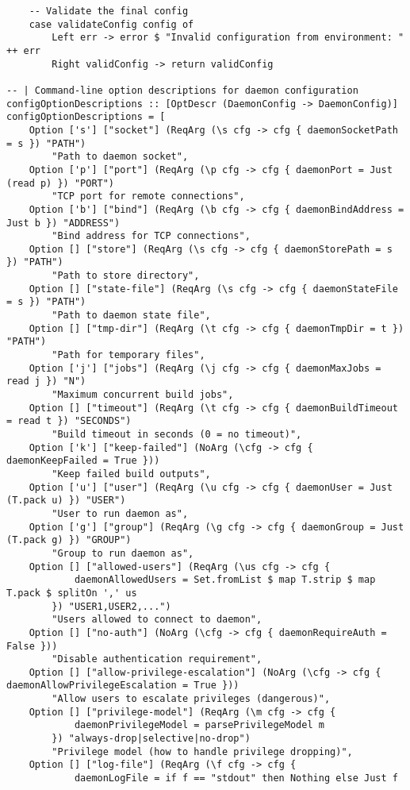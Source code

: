 \documentclass{article}
\begin{document}
\begin{tcolorbox}[title=Ten/Daemon/Config.hs Changes]
\begin{verbatim}
    -- Validate the final config
    case validateConfig config of
        Left err -> error $ "Invalid configuration from environment: " ++ err
        Right validConfig -> return validConfig

-- | Command-line option descriptions for daemon configuration
configOptionDescriptions :: [OptDescr (DaemonConfig -> DaemonConfig)]
configOptionDescriptions = [
    Option ['s'] ["socket"] (ReqArg (\s cfg -> cfg { daemonSocketPath = s }) "PATH")
        "Path to daemon socket",
    Option ['p'] ["port"] (ReqArg (\p cfg -> cfg { daemonPort = Just (read p) }) "PORT")
        "TCP port for remote connections",
    Option ['b'] ["bind"] (ReqArg (\b cfg -> cfg { daemonBindAddress = Just b }) "ADDRESS")
        "Bind address for TCP connections",
    Option [] ["store"] (ReqArg (\s cfg -> cfg { daemonStorePath = s }) "PATH")
        "Path to store directory",
    Option [] ["state-file"] (ReqArg (\s cfg -> cfg { daemonStateFile = s }) "PATH")
        "Path to daemon state file",
    Option [] ["tmp-dir"] (ReqArg (\t cfg -> cfg { daemonTmpDir = t }) "PATH")
        "Path for temporary files",
    Option ['j'] ["jobs"] (ReqArg (\j cfg -> cfg { daemonMaxJobs = read j }) "N")
        "Maximum concurrent build jobs",
    Option [] ["timeout"] (ReqArg (\t cfg -> cfg { daemonBuildTimeout = read t }) "SECONDS")
        "Build timeout in seconds (0 = no timeout)",
    Option ['k'] ["keep-failed"] (NoArg (\cfg -> cfg { daemonKeepFailed = True }))
        "Keep failed build outputs",
    Option ['u'] ["user"] (ReqArg (\u cfg -> cfg { daemonUser = Just (T.pack u) }) "USER")
        "User to run daemon as",
    Option ['g'] ["group"] (ReqArg (\g cfg -> cfg { daemonGroup = Just (T.pack g) }) "GROUP")
        "Group to run daemon as",
    Option [] ["allowed-users"] (ReqArg (\us cfg -> cfg {
            daemonAllowedUsers = Set.fromList $ map T.strip $ map T.pack $ splitOn ',' us
        }) "USER1,USER2,...")
        "Users allowed to connect to daemon",
    Option [] ["no-auth"] (NoArg (\cfg -> cfg { daemonRequireAuth = False }))
        "Disable authentication requirement",
    Option [] ["allow-privilege-escalation"] (NoArg (\cfg -> cfg { daemonAllowPrivilegeEscalation = True }))
        "Allow users to escalate privileges (dangerous)",
    Option [] ["privilege-model"] (ReqArg (\m cfg -> cfg {
            daemonPrivilegeModel = parsePrivilegeModel m
        }) "always-drop|selective|no-drop")
        "Privilege model (how to handle privilege dropping)",
    Option [] ["log-file"] (ReqArg (\f cfg -> cfg {
            daemonLogFile = if f == "stdout" then Nothing else Just f

\end{verbatim}
\end{tcolorbox}
\end{document}
